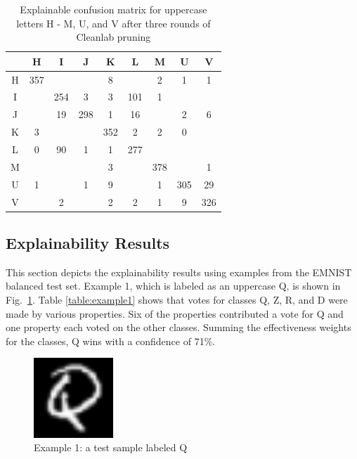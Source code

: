 \documentclass[conference]{IEEEtran}
\begin{document}
\begin{table}
    \centering
    \begin{tabular}{ |c|c|c|c|c|c|c|c|c|}
    \hline
    ~ & H & I & J & K & L & M & U & V \\
    \hline
    H & 357 & &  & 8 & & 2 & 1 & 1 \\
    \hline
    I &  & 254 & 3 & 3 & 101 & 1 & & \\
    \hline
    J & & 19 & 298 & 1 & 16 & & 2 & 6 \\
    \hline
    K & 3 &  &  & 352 & 2 & 2 & 0 & \\
    \hline
    L & 0 & 90 & 1 & 1 & 277 & & & \\
    \hline
    M & & & & 3 & & 378 & & 1 \\
    \hline
    U & 1 & & 1 & 9 & & 1 & 305 & 29 \\
    \hline
    V & & 2 & & 2 & 2 & 1 & 9 & 326 \\
    \hline
    \end{tabular}
    \caption{\label{raw_cap_cleanlab_third_confusion_matrix}Explainable confusion matrix for
    uppercase letters H - M, U, and V after three rounds of Cleanlab pruning}
\end{table}


\subsection{Explainability Results}


This section depicts the explainability results using examples from the EMNIST
balanced test set.  Example 1, which is labeled as an uppercase Q, is shown in
Fig.~\ref{fig:ex1}.  Table \ref{table:example1} shows that votes for classes Q,
Z, R, and D were made by various properties.  Six of the properties contributed
a vote for Q and one property each voted on the other classes.  Summing the
effectiveness weights for the classes, Q wins with a confidence of 71\%.

\begin{figure}
    \centering
    \includegraphics[width=3cm]{./images/examples/test-Q-0.png}
    \caption{Example 1: a test sample labeled Q}
    \label{fig:ex1}
\end{figure}
\end{document}

